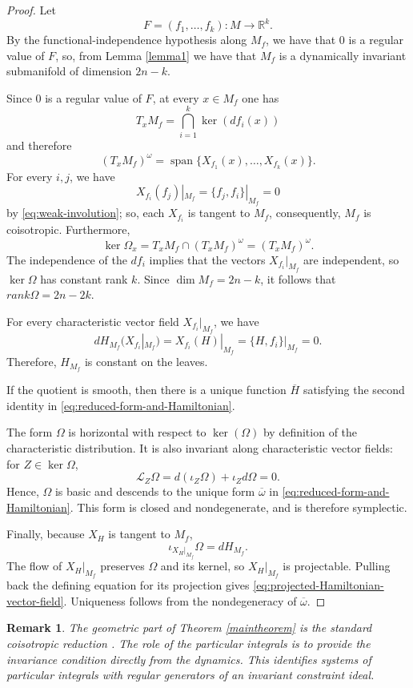 \documentclass[10pt,a4paper]{article}
\newtheorem{remark}{Remark}
\begin{document}
\begin{proof}
Let
\[
F=(f_1,\ldots,f_k)\colon M\longrightarrow\mathbb{R}^k.
\]
By the functional-independence hypothesis along $M_f$, we have that $0$ is a regular value of $F$, so, from Lemma \ref{lemma1} we have that $M_f$ is a dynamically invariant submanifold of dimension $2n-k$.

Since $0$ is a regular value of $F$, at every $x\in M_f$ one has
\[
  T_xM_f=\bigcap_{i=1}^k\ker(df_i(x))
\]
and therefore
\begin{equation*}
(T_xM_f)^\omega=\operatorname{span}\bigl\{X_{f_1}(x),\ldots,X_{f_k}(x)\bigr\}.
\label{eq:symplectic-orthogonal}
\end{equation*}
For every $i,j$, we have
\[
  X_{f_i}(f_j)|_{M_f}=\{f_j,f_i\}|_{M_f}=0
\]
by \eqref{eq:weak-involution}; so, each $X_{f_i}$ is tangent to $M_f$, consequently, $M_f$ is coisotropic. Furthermore,
\[
  \ker\Omega_x=T_xM_f\cap(T_xM_f)^\omega=(T_xM_f)^\omega.
\]
The independence of the $df_i$ implies that the vectors $X_{f_i}|_{M_f}$ are independent, so $\ker\Omega$ has constant rank $k$.  Since $\dim M_f=2n-k$, it follows that $rank\Omega=2n-2k$.

For every characteristic vector field $X_{f_i}|_{M_f}$, we have
\[
dH_{M_f}(X_{f_i}|_{M_f})
=X_{f_i}(H)|_{M_f}
=\{H,f_i\}|_{M_f}=0.
\]
Therefore, $H_{M_f}$ is constant on the leaves.

If the quotient is smooth, then there is a unique function $\overline{H}$ satisfying the second identity in
\eqref{eq:reduced-form-and-Hamiltonian}.

The form $\Omega$ is horizontal with respect to $\ker(\Omega)$ by definition of the characteristic distribution.  It is also invariant along characteristic vector fields: for $Z\in\ker\Omega$,
\[
\mathcal L_Z\Omega = d(\iota_Z\Omega)+\iota_Z d\Omega=0.
\]
Hence, $\Omega$ is basic and descends to the unique form
$\overline{\omega}$ in \eqref{eq:reduced-form-and-Hamiltonian}.  This form is closed and nondegenerate, and is therefore symplectic.

Finally, because $X_H$ is tangent to $M_f$,
\[
\iota_{X_H|_{M_f}}\Omega= dH_{M_f}.
\]
The flow of $X_H|_{M_f}$ preserves $\Omega$ and its kernel, so $X_H|_{M_f}$ is projectable. Pulling back the defining equation for its projection gives \eqref{eq:projected-Hamiltonian-vector-field}.  Uniqueness follows from the nondegeneracy of $\overline{\omega}$.
\end{proof}

\begin{remark}
\label{rem:standard-coisotropic-reduction}
The geometric part of Theorem \ref{maintheorem} is the standard coisotropic reduction
\cite{gotay1978presymplectic,echeverria1999reduction,deLeon_2024}.
The role of the particular integrals is to provide the invariance
condition directly from the dynamics. This identifies systems of particular integrals with regular generators of an invariant constraint ideal.
\end{remark}
\end{document}

